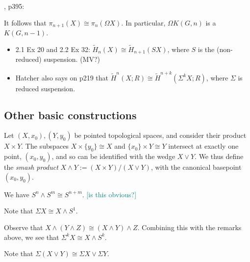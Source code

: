 \documentclass{MetricNotes2023}
\def\textcolour{\textcolor}
\begin{document}
\autocite{hatcher}, p395:

\begin{remark}
It follows that \(\pi_{n+1}(X)\cong \pi_n(\Omega X)\). In particular, \(\Omega K(G, n)\) is a \newline\(K(G, n-1)\). 
\end{remark}

\begin{itemize}
\item \autocite{hatcher} 2.1 Ex 20 and 2.2 Ex 32: \(\widetilde H_n(X)\cong \widetilde H_{n+1}(SX)\), where \(S\) is the (non-reduced) suspension.  (MV?) 
\item Hatcher also says on p219 that \(\widetilde H^n(X;R)\cong \widetilde H^{n+k}(\Sigma^kX;R)\), where \(\Sigma \) is reduced suspension.
\end{itemize}

\subsection{Other basic constructions}

\begin{definition}
Let \((X, x_0), (Y, y_0)\) be pointed topological spaces, and consider their product \(X\times Y\). The subspaces \(X\times\{y_0\}\cong X\) and \(\{x_0\}\times Y\cong Y\) intersect at exactly one point, \((x_0, y_0)\), and so can be identified with the wedge \(X\vee Y\). We thus define the \textit{smash product} \(X\wedge Y:=(X\times Y)/(X\vee Y)\), with the canonical basepoint \((x_0,y_0)\).  
\end{definition}

\begin{example}
We have \(S^n \wedge S^m\cong S^{n+m}\). \textcolour{teal}{[is this obvious?]}
\end{example}

\begin{remark}
Note that \(\Sigma X \cong X\wedge S^1\). 
\end{remark}

\begin{remark}\label{2503311142}
Observe that \(X\wedge (Y\wedge Z)\cong (X\wedge Y)\wedge Z\). Combining this with the remarks above, we see that \(\Sigma^kX\cong X\wedge S^k\). 
\end{remark}

\begin{remark}\label{2502211505}
Note that \(\Sigma(X\vee Y)\cong \Sigma X\vee \Sigma Y\).
\end{remark}
\end{document}
